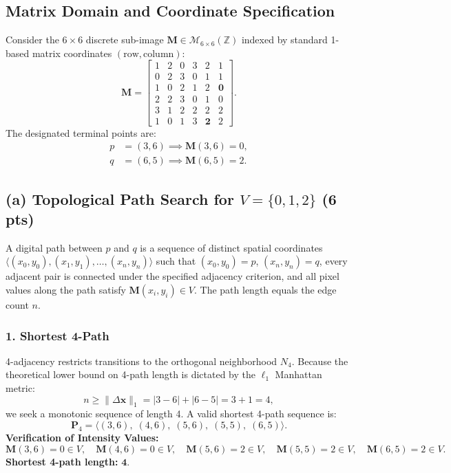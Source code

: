 \documentclass[11pt,a4paper]{article}
\begin{document}
\subsection{Matrix Domain and Coordinate Specification}
Consider the $6 \times 6$ discrete sub-image $\mathbf{M} \in \mathcal{M}_{6 \times 6}(\mathbb{Z})$ indexed by standard 1-based matrix coordinates $(\text{row}, \text{column})$:
\begin{equation}
\mathbf{M} = \begin{bmatrix}
1 & 2 & 0 & 3 & 2 & 1 \\
0 & 2 & 3 & 0 & 1 & 1 \\
1 & 0 & 2 & 1 & 2 & \mathbf{0} \\
2 & 2 & 3 & 0 & 1 & 0 \\
3 & 1 & 2 & 2 & 2 & 2 \\
1 & 0 & 1 & 3 & \mathbf{2} & 2
\end{bmatrix}.
\end{equation}
The designated terminal points are:
\begin{align}
p &= (3, 6) \implies \mathbf{M}(3, 6) = 0, \\
q &= (6, 5) \implies \mathbf{M}(6, 5) = 2.
\end{align}

\subsection{(a) Topological Path Search for $V = \{0, 1, 2\}$ (6 pts)}
A digital path between $p$ and $q$ is a sequence of distinct spatial coordinates $\langle (x_0, y_0), (x_1, y_1), \dots, (x_n, y_n) \rangle$ such that $(x_0, y_0) = p$, $(x_n, y_n) = q$, every adjacent pair is connected under the specified adjacency criterion, and all pixel values along the path satisfy $\mathbf{M}(x_i, y_i) \in V$. The path length equals the edge count $n$.

\subsubsection{1. Shortest 4-Path}
4-adjacency restricts transitions to the orthogonal neighborhood $N_4$. Because the theoretical lower bound on 4-path length is dictated by the $\ell_1$ Manhattan metric:
\begin{equation}
n \ge \|\Delta \mathbf{x}\|_1 = |3 - 6| + |6 - 5| = 3 + 1 = 4,
\end{equation}
we seek a monotonic sequence of length 4. A valid shortest 4-path sequence is:
\begin{equation}
\mathbf{P}_4 = \langle (3, 6), \; (4, 6), \; (5, 6), \; (5, 5), \; (6, 5) \rangle.
\end{equation}
\noindent\textbf{Verification of Intensity Values:}
\begin{equation}
\mathbf{M}(3, 6) = 0 \in V, \quad \mathbf{M}(4, 6) = 0 \in V, \quad \mathbf{M}(5, 6) = 2 \in V, \quad \mathbf{M}(5, 5) = 2 \in V, \quad \mathbf{M}(6, 5) = 2 \in V.
\end{equation}
\noindent\textbf{Shortest 4-path length:} $\mathbf{4}$.
\end{document}
